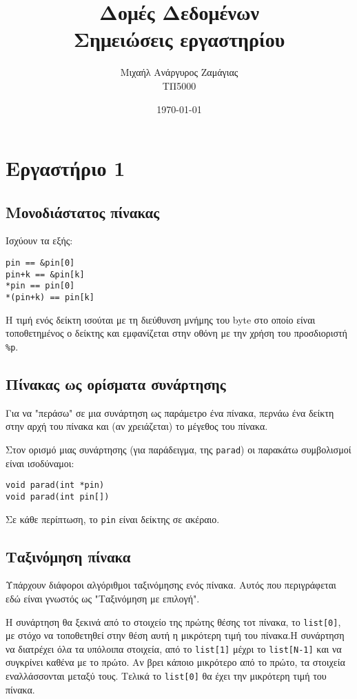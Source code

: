 \documentclass[14pt, fleqn, leqno]{extreport}
\begin{document}
\title{Δομές Δεδομένων\\Σημειώσεις εργαστηρίου}
\author{Μιχαήλ Ανάργυρος Ζαμάγιας\\ΤΠ5000}
\date{\today}
\maketitle
\newpage

\tableofcontents

\newpage
\chapter{Εργαστήριο 1}

\section{Μονοδιάστατος πίνακας}

Ισχύουν τα εξής:
\begin{lstlisting}
pin == &pin[0]
pin+k == &pin[k]
*pin == pin[0]
*(pin+k) == pin[k]
\end{lstlisting}

Η τιμή ενός δείκτη ισούται με τη διεύθυνση μνήμης του byte στο οποίο είναι τοποθετημένος ο δείκτης και εμφανίζεται στην οθόνη με την χρήση του προσδιοριστή \lstinline{%p}.

\section{Πίνακας ως ορίσματα συνάρτησης}

Για να "περάσω" σε μια συνάρτηση ως παράμετρο ένα πίνακα, περνάω ένα δείκτη στην αρχή του πίνακα και (αν χρειάζεται) το μέγεθος του πίνακα.

Στον ορισμό μιας συνάρτησης (για παράδειγμα, της \lstinline{parad}) οι παρακάτω συμβολισμοί είναι ισοδύναμοι:
\begin{lstlisting}
void parad(int *pin)
void parad(int pin[])
\end{lstlisting}
Σε κάθε περίπτωση, το \lstinline{pin} είναι δείκτης σε ακέραιο.

\section{Ταξινόμηση πίνακα}

Υπάρχουν διάφοροι αλγόριθμοι ταξινόμησης ενός πίνακα. Αυτός που περιγράφεται εδώ είναι γνωστός ως "Ταξινόμηση με επιλογή".

Η συνάρτηση θα ξεκινά από το στοιχείο της πρώτης θέσης τοτ πίνακα, το \lstinline{list[0]}, με στόχο να τοποθετηθεί στην θέση αυτή η μικρότερη τιμή του πίνακα.Η συνάρτηση να διατρέχει όλα τα υπόλοιπα στοιχεία, από το \lstinline{list[1]} μέχρι το \lstinline{list[N-1]} και να συγκρίνει καθένα με το πρώτο. Αν βρει κάποιο μικρότερο από το πρώτο, τα στοιχεία εναλλάσσονται μεταξύ τους. Τελικά το \lstinline{list[0]} θα έχει την μικρότερη τιμή του πίνακα.
\end{document}
